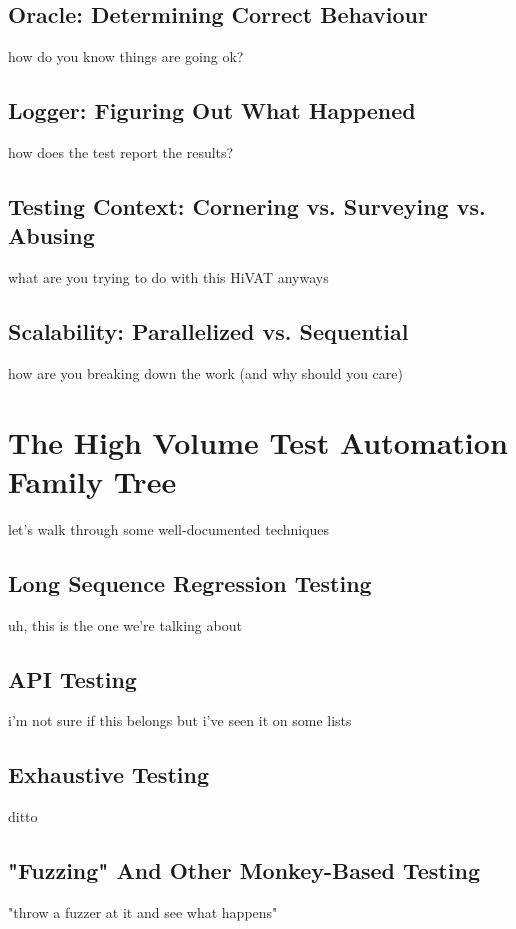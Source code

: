 \subsection{Oracle: Determining Correct Behaviour}
how do you know things are going ok? %

\subsection{Logger: Figuring Out What Happened}
how does the test report the results? %

\subsection{Testing Context: Cornering vs. Surveying vs. Abusing}
what are you trying to do with this HiVAT anyways %

\subsection{Scalability: Parallelized vs. Sequential}
how are you breaking down the work (and why should you care) %

\section{The High Volume Test Automation Family Tree}
let's walk through some well-documented techniques %

\subsection{Long Sequence Regression Testing}
uh, this is the one we're talking about \citep{lee1996principles} %

\subsection{API Testing}
i'm not sure if this belongs but i've seen it on some lists %

\subsection{Exhaustive Testing}
ditto %

\subsection{"Fuzzing" And Other Monkey-Based Testing}
 "throw a fuzzer at it and see what happens" %

